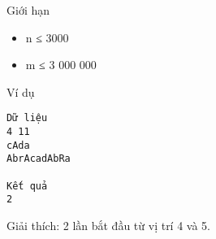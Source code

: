 Giới hạn
\begin{itemize}
	\item     n ≤ 3000   
	\item     m ≤ 3 000 000   
\end{itemize}
Ví dụ
\begin{verbatim}
Dữ liệu
4 11
cAda
AbrAcadAbRa

Kết quả
2
\end{verbatim}

       Giải thích:      2 lần bắt đầu từ vị trí 4 và 5.